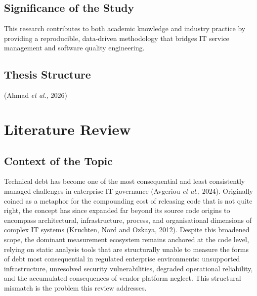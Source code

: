\documentclass[
  british,
  12pt,
  a4paper,
]{report}
\begin{document}
\section{Significance of the Study}\label{significance-of-the-study}

This research contributes to both academic knowledge and industry
practice by providing a reproducible, data-driven methodology that
bridges IT service management and software quality engineering.

\section{Thesis Structure}\label{thesis-structure}

(Ahmad \emph{et al.}, 2026)


\chapter{Literature Review}\label{literature-review}

\section{Context of the Topic}\label{context-of-the-topic}

Technical debt has become one of the most consequential and least
consistently managed challenges in enterprise IT governance (Avgeriou
\emph{et al.}, 2024). Originally coined as a metaphor for the
compounding cost of releasing code that is not quite right, the concept
has since expanded far beyond its source code origins to encompass
architectural, infrastructure, process, and organisational dimensions of
complex IT systems (Kruchten, Nord and Ozkaya, 2012). Despite this
broadened scope, the dominant measurement ecosystem remains anchored at
the code level, relying on static analysis tools that are structurally
unable to measure the forms of debt most consequential in regulated
enterprise environments: unsupported infrastructure, unresolved security
vulnerabilities, degraded operational reliability, and the accumulated
consequences of vendor platform neglect. This structural mismatch is the
problem this review addresses.
\end{document}
